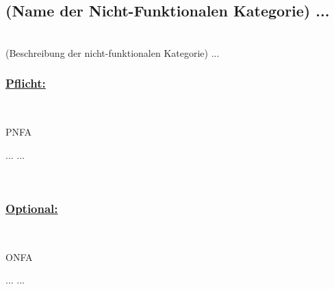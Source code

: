 %
%

\subsection{(Name der Nicht-Funktionalen Kategorie) ...}

%
%
\renewcommand{\K}{}

~\\
(Beschreibung der nicht-funktionalen Kategorie) ...
\\

%
%
\subsubsection*{\underline{Pflicht:}}~\\

\begin{ids}{\gls{PNFA\K}} 

	\id[ 1] ...
 	\id[10] ...
	
\end{ids}

~\\


%
%
\subsubsection*{\underline{Optional:}}~\\


\begin{ids}{\gls{ONFA\K}}

	\id[ 11] ...
 	\id[100] ...
	
\end{ids}

~\\
